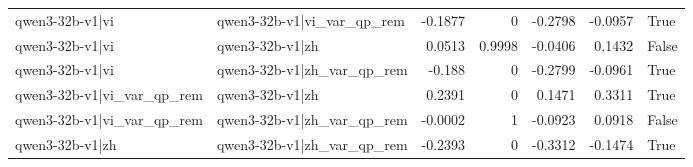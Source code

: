 \begin{table}
\begin{tabular}{l l r r r r l}
qwen3-32b-v1|vi & qwen3-32b-v1|vi_var_qp_rem & -0.1877 & 0 & -0.2798 & -0.0957 & True \\
qwen3-32b-v1|vi & qwen3-32b-v1|zh & 0.0513 & 0.9998 & -0.0406 & 0.1432 & False \\
qwen3-32b-v1|vi & qwen3-32b-v1|zh_var_qp_rem & -0.188 & 0 & -0.2799 & -0.0961 & True \\
qwen3-32b-v1|vi_var_qp_rem & qwen3-32b-v1|zh & 0.2391 & 0 & 0.1471 & 0.3311 & True \\
qwen3-32b-v1|vi_var_qp_rem & qwen3-32b-v1|zh_var_qp_rem & -0.0002 & 1 & -0.0923 & 0.0918 & False \\
qwen3-32b-v1|zh & qwen3-32b-v1|zh_var_qp_rem & -0.2393 & 0 & -0.3312 & -0.1474 & True \\
\bottomrule
\end{tabular}
\end{table}
